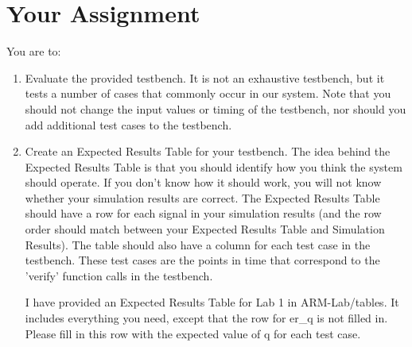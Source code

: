 \section{Your Assignment}

You are to:
\begin{enumerate}
\item Evaluate the provided testbench.  It is not an exhaustive testbench, but it tests a number of cases that commonly occur in our system.  Note that you should not change the input values or timing of the testbench, nor should you add additional test cases to the testbench.
\item Create an Expected Results Table for your testbench.  The idea behind the Expected Results Table is that you should identify how you think the system should operate.  If you don't know how it should work, you will not know whether your simulation results are correct.  The Expected Results Table should have a row for each signal in your simulation results (and the row order should match between your Expected Results Table and Simulation Results).  The table should also have a column for each test case in the testbench.  These test cases are the points in time that correspond to the 'verify' function calls in the testbench.

I have provided an Expected Results Table for Lab 1 in ARM-Lab/tables.  It includes everything you need, except that the row for er\_q is not filled in. Please fill in this row with the expected value of q for each test case. 



\end{enumerate}
